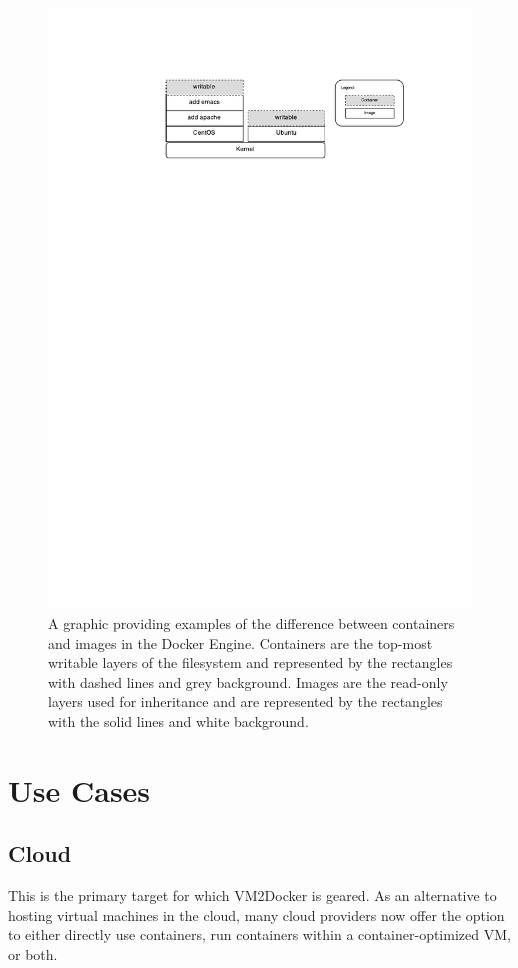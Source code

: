 \begin{figure}[h]
\centering
    \includegraphics[width=1.0\textwidth]{cvimage.pdf}
    \caption{A graphic providing examples of the difference between containers and images in the Docker Engine. Containers are the top-most writable layers of the filesystem and represented by the rectangles with dashed lines and grey background. Images are the read-only layers used for inheritance and are represented by the rectangles with the solid lines and white background.}
\label{ch2:imagevcontainers}
\end{figure}

\section{Use Cases}\label{ch2:usecase}
\subsection{Cloud}
This is the primary target for which VM2Docker is geared. As an alternative to hosting virtual machines in the cloud, many cloud providers now offer the option to either directly use containers, run containers within a container-optimized VM, or both.

